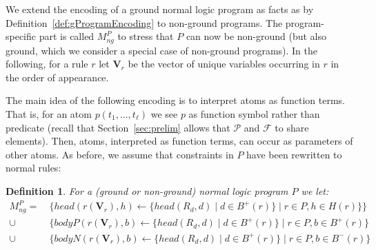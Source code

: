 \documentclass[11pt,fleqn,twoside]{article}
\renewcommand{\vec}[1]{\ensuremath{\mb{#1}}}
\newcommand{\mb}[1]{\ensuremath{\mathbf{#1}}}
\newcommand{\Program}{\ensuremath{P}}
\newtheorem{definition}{Definition}
\begin{document}
			We extend the encoding of a ground normal logic program as facts as by Definition~\ref{def:gProgramEncoding} to non-ground programs.
			The program-specific part is called $M^P_{\mathit{ng}}$ to stress that $P$ can now be non-ground (but also ground, which we consider a special case of non-ground programs).
			In the following, for a rule $r$ let $\vec{V}_r$ be the vector of unique variables occurring in $r$ in the order of appearance.

			The main idea of the following encoding is to interpret atoms as function terms.
			That is, for an atom $p(t_1, \ldots, t_\ell)$ we see $p$ as function symbol rather than predicate (recall that Section~\ref{sec:prelim} allows that $\mathcal{P}$ and $\mathcal{F}$ to share elements).
			Then, atoms, interpreted as function terms, can occur as parameters of other atoms.
			As before, we assume that constraints in $\Program$ have been rewritten to normal rules:

			\begin{definition}
				\label{def:ngProgramEncoding}
				For a (ground or non-ground) normal logic program $P$ we let:
				\begin{align*}
					M^P_{\mathit{ng}} =& \ \{ \mathit{head}(r(\vec{V}_r), h) \leftarrow \{ \mathit{head}(R_d,d) \mid d \in B^{+}(r) \} \mid r \in P, h \in H(r) \} \} \\
						\cup & \ \{ \mathit{bodyP}(r(\vec{V}_r), b) \leftarrow \{ \mathit{head}(R_d,d) \mid d \in B^{+}(r) \} \mid r \in P, b \in B^{+}(r) \} \\
						\cup & \ \{ \mathit{bodyN}(r(\vec{V}_r), b) \leftarrow \{ \mathit{head}(R_d,d) \mid d \in B^{+}(r) \} \mid r \in P, b \in B^{-}(r) \}
				\end{align*}
			\end{definition}
\end{document}
